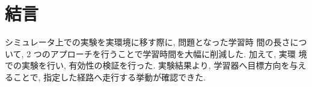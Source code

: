 \documentclass[10pt]{jarticle}
\begin{document}
    
    
    
        
    \section{結\hspace{2zw}言}%
    
    シミュレータ上での実験を実環境に移す際に, 問題となった学習時
    間の長さについて, 2 つのアプローチを行うことで学習時間を大幅に削減した. 加えて, 実環
    境での実験を行い, 有効性の検証を行った. 実験結果より, 学習器へ目標方向を与えることで,
    指定した経路へ走行する挙動が確認できた.
    
\end{document}
